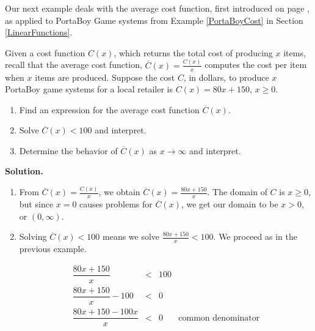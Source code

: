 \smallskip

Our next example deals with the average cost function, first introduced on page \pageref{pricerevenuecostprofit}, as applied to PortaBoy Game systems from Example \ref{PortaBoyCost} in Section \ref{LinearFunctions}.

\begin{ex}  Given a cost function $C(x)$, which returns the total cost of producing $x$ items, recall that the average cost function, $\overline{C}(x) = \frac{C(x)}{x}$ computes the cost per item when $x$ items are produced.  Suppose the cost $C$, in dollars, to produce $x$ PortaBoy game systems for a local retailer is $C(x) = 80x + 150$, $x \geq 0$.

\begin{enumerate}

\item  Find an expression for the average cost function $\overline{C}(x)$. 

\item  Solve $\overline{C}(x) < 100$ and interpret.

\item  Determine the behavior of $\overline{C}(x)$ as $x \rightarrow \infty$ and interpret.


\end{enumerate}

{\bf Solution.}

\begin{enumerate}

\item  From $\overline{C}(x) = \frac{C(x)}{x}$, we obtain $\overline{C}(x) = \frac{80x+150}{x}$.  The domain of $C$ is $x \geq 0$, but since $x=0$ causes problems for $\overline{C}(x)$, we get our domain to be $x>0$, or $(0, \infty)$.

\item  Solving $\overline{C}(x) < 100$ means we solve $\frac{80x+150}{x} < 100$.  We proceed as in the previous example.

\[ \begin{array}{rclr}

\dfrac{80x+150}{x} & < & 100 & \\ [10pt]

\dfrac{80x+150}{x} - 100 & < & 0 & \\ [10pt]

\dfrac{80x + 150 - 100x}{x} & < & 0 & \mbox{common denominator} \\ [10pt]


\end{array}\]
\end{enumerate}
\end{ex}
